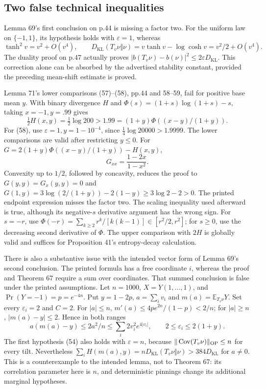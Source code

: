 \documentclass[10pt]{article}
\begin{document}
\subsection*{Two false technical inequalities}
Lemma 69’s first conclusion on p.44 is missing a factor two. For the uniform law on \(\{-1,1\}\), its hypothesis holds with \(\varepsilon=1\), whereas \[\tanh^2v=v^2+O(v^4),\qquad
 D_{\mathrm{KL}}(T_v\nu\Vert\nu)=v\tanh v-\log\cosh v
                 =v^2/2+O(v^4).\] The duality proof on p.47 actually proves \(|b(T_v\nu)-b(\nu)|^2\le2\varepsilon D_{\mathrm{KL}}\). This correction alone can be absorbed by the advertised stability constant, provided the preceding mean-shift estimate is proved.\par
Lemma 71’s lower comparisons (57)–(58), pp.44 and 58–59, fail for positive base mean \(y\). With binary divergence \(H\) and \(\Phi(s)=(1+s)\log(1+s)-s\), taking \(x=-1,y=.99\) gives \[\tfrac12 H(x,y)=\tfrac12\log200>1.99
       =(1+y)\Phi((x-y)/(1+y)).\] For (58), use \(\varepsilon=1,y=1-10^{-4}\), since \(\frac14\log20000>1.9999\). The lower comparisons are valid after restricting \(y\le0\). For \(G=2(1+y)\Phi((x-y)/(1+y))-H(x,y)\), \[G_{xx}=\frac{1-2x}{1-x^2}.\] Convexity up to \(1/2\), followed by concavity, reduces the proof to \(G(y,y)=G_x(y,y)=0\) and \(G(1,y)=3\log(2/(1+y))-2(1-y)\ge3\log2-2>0\). The printed endpoint expression misses the factor two. The scaling inequality used afterward is true, although its negative-\(s\) derivative argument has the wrong sign. For \(s=-r\), use \(\Phi(-r)=\sum_{k\ge2}r^k/[k(k-1)]\in[r^2/2,r^2]\); for \(s\ge0\), use the decreasing second derivative of \(\Phi\). The upper comparison with \(2H\) is globally valid and suffices for Proposition 41’s entropy-decay calculation.\par
There is also a substantive issue with the intended vector form of Lemma 69’s second conclusion. The printed formula has a free coordinate \(i\), whereas the proof and Theorem 67 require a sum over coordinates. That summed conclusion is false under the printed assumptions. Let \(n=1000\), \(X=Y(1,\ldots,1)\), and \(\Pr(Y=-1)=p=e^{-4n}\). Put \(y=1-2p\), \(a=\sum_i v_i\) and \(m(a)=\mathbb E_{T_v\nu}Y\). Set every \(\varepsilon_i=2\) and \(C=2\). For \(|a|\le n\), \(m'(a)\le4pe^{2n}/(1-p)<2/n\); for \(|a|\ge n\), \(|m(a)-y|\le2\). Hence in both ranges \[a(m(a)-y)\le2a^2/n
       \le\sum_i2v_i^2e^{4|v_i|},
 \qquad 2\le\varepsilon_i\le2(1+y).\] The first hypothesis (54) also holds with \(\varepsilon=n\), because \(\|\operatorname{Cov}(T_v\nu)\|_{\rm OP}\le n\) for every tilt. Nevertheless \(\sum_iH(m(a),y)=nD_{\mathrm{KL}}(T_v\nu\Vert\nu)>384D_{\mathrm{KL}}\) for \(a\ne0\). This is a counterexample to the intended lemma, not to Theorem 67: its correlation parameter here is \(n\), and deterministic pinnings change its additional marginal hypotheses.\par
\end{document}
